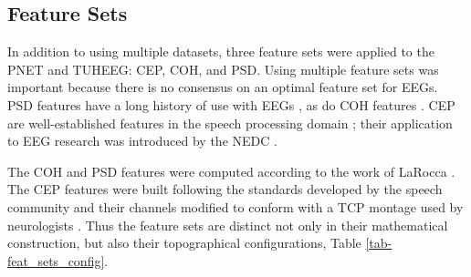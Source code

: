 \medskip
\noindent{}
\medskip

\subsection{Feature Sets}

In addition to using multiple datasets, three feature sets were applied to the \ac{PNET} and \ac{TUHEEG}: \acf{CEP}, \acf{COH}, and \acf{PSD}. Using multiple feature sets was important because there is no consensus on an optimal feature set for \acp{EEG}. \ac{PSD} features have a long history of use with \acp{EEG} \cite{Lotte2007b,Dymond1978,Berka2007}, as do \ac{COH} features \cite{Rocca2014,Ruiz-blondet2016}. \ac{CEP} are well-established features in the speech processing domain \cite{Furui1981,Li2013a}; their application to EEG research was introduced by the \ac{NEDC} \cite{Harati2015a}. 

The \ac{COH} and \ac{PSD} features were computed according to the work of LaRocca \cite{Rocca2014}. The \ac{CEP} features were built following the standards developed by the speech community \cite{Harati2015a} and their channels modified to conform with a \ac{TCP} montage used by neurologists \cite{Lopez2015}. Thus the feature sets are distinct not only in their mathematical construction, but also their topographical configurations, Table \ref{tab-feat_sets_config}. 

